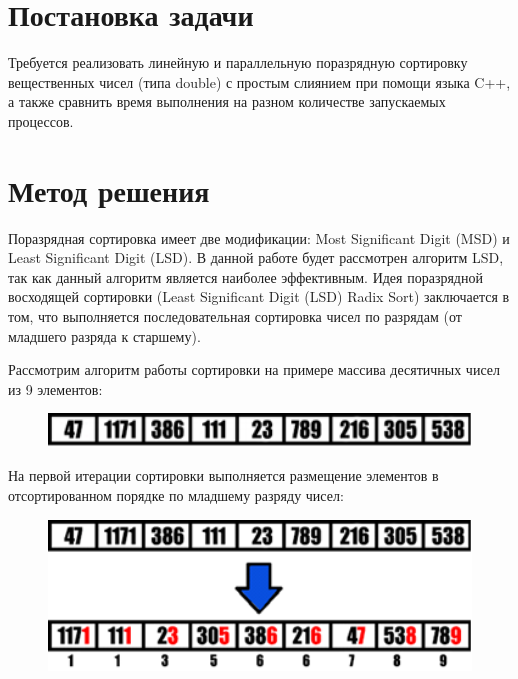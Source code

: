 \documentclass{report}
\begin{document}
\setcounter{page}{2}

\tableofcontents
\newpage

\section*{Постановка задачи}
Требуется реализовать линейную и параллельную поразрядную сортировку вещественных чисел (типа double) с простым слиянием при помощи языка C++, а также сравнить время выполнения на разном количестве запускаемых процессов.
\newpage

\section*{Метод решения}
Поразрядная сортировка имеет две модификации: Most Significant Digit (MSD) и Least Significant Digit (LSD). В данной работе будет рассмотрен алгоритм LSD, так как данный алгоритм является наиболее эффективным. Идея поразрядной восходящей сортировки (Least Significant Digit (LSD) Radix Sort) заключается в том, что выполняется последовательная сортировка чисел по разрядам (от младшего разряда к старшему). 

Рассмотрим алгоритм работы сортировки на примере массива десятичных чисел из 9 элементов:

\begin{figure}[htp]
    \centering
    \includegraphics[width=14cm]{image1}
    \label{fig:galaxy}
\end{figure}

На первой итерации сортировки выполняется размещение элементов в отсортированном порядке по младшему разряду чисел:

\begin{figure}[htp]
    \centering
    \includegraphics[width=14cm]{image2}
    \label{fig:galaxy}
\end{figure}
\end{document}
